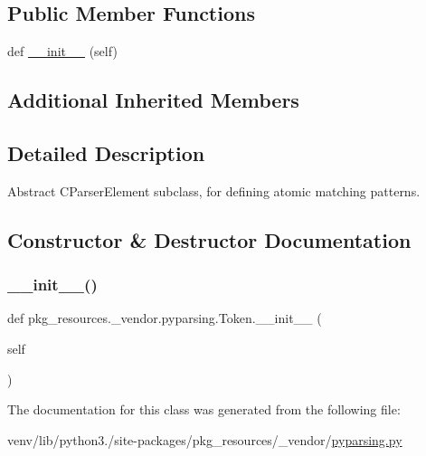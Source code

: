 \subsection*{Public Member Functions}
\begin{DoxyCompactItemize}
\item 
def \hyperlink{classpkg__resources_1_1__vendor_1_1pyparsing_1_1Token_a2891da2d424f372ad254cebfb21c8da4}{\+\_\+\+\_\+init\+\_\+\+\_\+} (self)
\end{DoxyCompactItemize}
\subsection*{Additional Inherited Members}


\subsection{Detailed Description}
\begin{DoxyVerb}Abstract C{ParserElement} subclass, for defining atomic matching patterns.
\end{DoxyVerb}
 

\subsection{Constructor \& Destructor Documentation}
\mbox{\label{classpkg__resources_1_1__vendor_1_1pyparsing_1_1Token_a2891da2d424f372ad254cebfb21c8da4}} 
\subsubsection{\texorpdfstring{\+\_\+\+\_\+init\+\_\+\+\_\+()}{\_\_init\_\_()}}
{\footnotesize\ttfamily def pkg\+\_\+resources.\+\_\+vendor.\+pyparsing.\+Token.\+\_\+\+\_\+init\+\_\+\+\_\+ (\begin{DoxyParamCaption}\item[{}]{self }\end{DoxyParamCaption})}



The documentation for this class was generated from the following file\+:\begin{DoxyCompactItemize}
\item 
venv/lib/python3./site-\/packages/pkg\+\_\+resources/\+\_\+vendor/\hyperlink{pkg__resources_2__vendor_2pyparsing_8py}{pyparsing.\+py}\end{DoxyCompactItemize}
